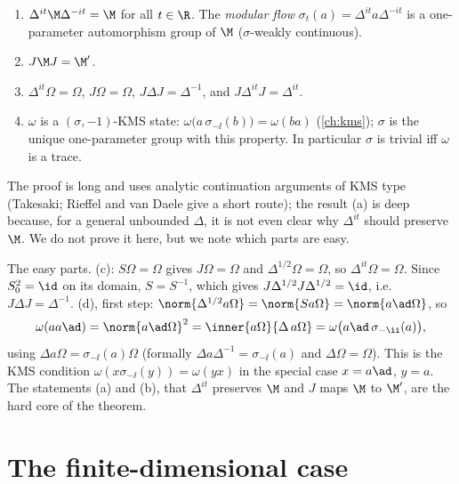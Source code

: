 \begin{theorem}\label{thm:TT}
\begin{enumerate}[label=(\alph*)]
\item $\Delta^{it}\M\Delta^{-it}=\M$ for all $t\in\R$. The \emph{modular flow} $\sigma_t(a)=\Delta^{it}a\Delta^{-it}$ is a one-parameter automorphism group of $\M$ ($\sigma$-weakly continuous).
\item $J\M J=\M'$.
\item $\Delta^{it}\Omega=\Omega$, $J\Omega=\Omega$, $J\Delta J=\Delta^{-1}$, and $J\Delta^{it}J=\Delta^{it}$.
\item $\omega$ is a $(\sigma,-1)$-KMS state: $\omega\big(a\,\sigma_{-\ii}(b)\big)=\omega(ba)$ (\cref{ch:kms}); $\sigma$ is the unique one-parameter group with this property. In particular $\sigma$ is trivial iff $\omega$ is a trace.
\end{enumerate}
\end{theorem}

The proof is long and uses analytic continuation arguments of KMS type (Takesaki; Rieffel and van Daele give a short route); the result (a) is deep because, for a general unbounded $\Delta$, it is not even clear why $\Delta^{it}$ should preserve $\M$. We do not prove it here, but we note which parts are easy.

\begin{proofsketch}
The easy parts. (c): $S\Omega=\Omega$ gives $J\Omega=\Omega$ and $\Delta^{1/2}\Omega=\Omega$, so $\Delta^{it}\Omega=\Omega$. Since $S_0^2=\id$ on its domain, $S=S^{-1}$, which gives $J\Delta^{1/2}J\Delta^{1/2}=\id$, i.e.\ $J\Delta J=\Delta^{-1}$. (d), first step: $\norm{\Delta^{1/2}a\Omega}=\norm{Sa\Omega}=\norm{a\ad\Omega}$, so
\[
\omega(aa\ad)=\norm{a\ad\Omega}^2=\inner{a\Omega}{\Delta\,a\Omega}=\omega\big(a\ad\,\sigma_{-\ii}(a)\big),
\]
using $\Delta a\Omega=\sigma_{-\ii}(a)\Omega$ (formally $\Delta a\Delta^{-1}=\sigma_{-\ii}(a)$ and $\Delta\Omega=\Omega$). This is the KMS condition $\omega(x\sigma_{-\ii}(y))=\omega(yx)$ in the special case $x=a\ad$, $y=a$. The statements (a) and (b), that $\Delta^{it}$ preserves $\M$ and $J$ maps $\M$ to $\M'$, are the hard core of the theorem.
\end{proofsketch}

\section{The finite-dimensional case}

